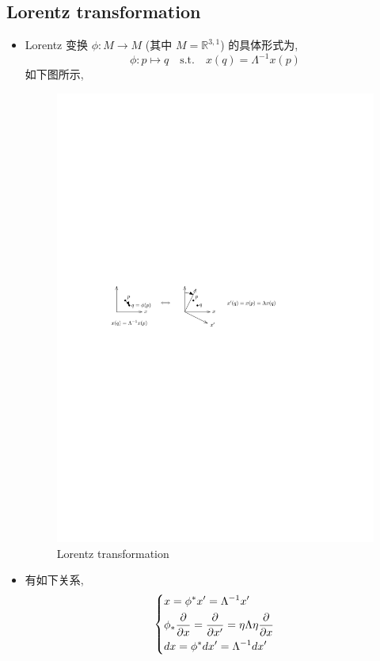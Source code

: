 \documentclass[10pt, a4paper]{article}
\numberwithin{equation}{section}
\begin{document}
	\subsection{Lorentz transformation}
	\begin{itemize}
		\item Lorentz 变换 $\phi : M \rightarrow M$ (其中 $M = \mathbb{R}^{3, 1}$) 的具体形式为,
		\begin{equation}
			\phi : p \mapsto q \quad \text{s.t.} \quad x(q) = \Lambda^{- 1} x(p)
		\end{equation}
		如下图所示,
		
		\begin{figure}[H]
			\centering
			\includegraphics[scale=1]{figures/Lorentz transformation.pdf}
			\caption{Lorentz transformation}
		\end{figure}
		
		\item 有如下关系,
		\begin{equation}
			\begin{dcases}
				x = \phi^* x' = \Lambda^{- 1} x' \\
				\phi_* \frac{\partial}{\partial x} = \frac{\partial}{\partial x'} = \eta \Lambda \eta \frac{\partial}{\partial x} \\
				dx = \phi^* dx' = \Lambda^{- 1} dx'
			\end{dcases}
		\end{equation}
		

\end{itemize}
\end{document}
